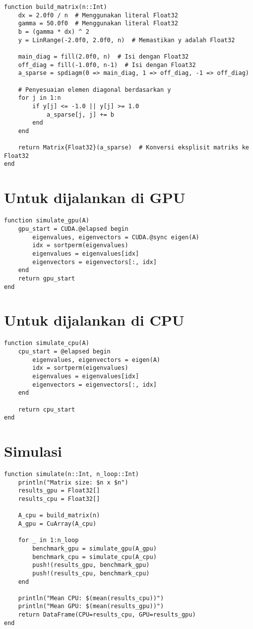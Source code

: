 \begin{lstlisting}
function build_matrix(n::Int)
    dx = 2.0f0 / n  # Menggunakan literal Float32
    gamma = 50.0f0  # Menggunakan literal Float32
    b = (gamma * dx) ^ 2
    y = LinRange(-2.0f0, 2.0f0, n)  # Memastikan y adalah Float32

    main_diag = fill(2.0f0, n)  # Isi dengan Float32
    off_diag = fill(-1.0f0, n-1)  # Isi dengan Float32
    a_sparse = spdiagm(0 => main_diag, 1 => off_diag, -1 => off_diag)

    # Penyesuaian elemen diagonal berdasarkan y
    for j in 1:n
        if y[j] <= -1.0 || y[j] >= 1.0
            a_sparse[j, j] += b
        end
    end

    return Matrix{Float32}(a_sparse)  # Konversi eksplisit matriks ke Float32
end
\end{lstlisting}

\section{Untuk dijalankan di GPU}

\begin{lstlisting}
function simulate_gpu(A)
    gpu_start = CUDA.@elapsed begin
        eigenvalues, eigenvectors = CUDA.@sync eigen(A)
        idx = sortperm(eigenvalues)
        eigenvalues = eigenvalues[idx]
        eigenvectors = eigenvectors[:, idx]
    end
    return gpu_start
end
\end{lstlisting}

\section{Untuk dijalankan di CPU}

\begin{lstlisting}
function simulate_cpu(A)
    cpu_start = @elapsed begin
        eigenvalues, eigenvectors = eigen(A)
        idx = sortperm(eigenvalues)
        eigenvalues = eigenvalues[idx]
        eigenvectors = eigenvectors[:, idx]
    end

    return cpu_start
end
\end{lstlisting}

\section{Simulasi}

\begin{lstlisting}
function simulate(n::Int, n_loop::Int)
    println("Matrix size: $n x $n")
    results_gpu = Float32[]
    results_cpu = Float32[]

    A_cpu = build_matrix(n)
    A_gpu = CuArray(A_cpu)

    for _ in 1:n_loop
        benchmark_gpu = simulate_gpu(A_gpu)
        benchmark_cpu = simulate_cpu(A_cpu)
        push!(results_gpu, benchmark_gpu)
        push!(results_cpu, benchmark_cpu)
    end

    println("Mean CPU: $(mean(results_cpu))")
    println("Mean GPU: $(mean(results_gpu))")
    return DataFrame(CPU=results_cpu, GPU=results_gpu)
end
\end{lstlisting}
